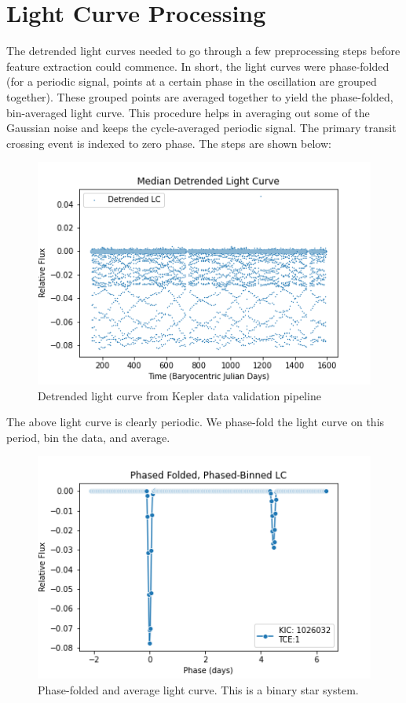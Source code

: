 \documentclass{article}
\begin{document}
\section{Light Curve Processing}
The detrended light curves needed to go through a few preprocessing steps before feature extraction could commence. In short, the light curves were phase-folded (for a periodic signal, points at a certain phase in the oscillation are grouped together). These grouped points are averaged together to yield the phase-folded, bin-averaged light curve. This procedure helps in averaging out some of the Gaussian noise and keeps the cycle-averaged periodic signal. The primary transit crossing event is indexed to zero phase. The steps are shown below:

 \begin{figure}[H]
	\begin{center}
		\includegraphics[totalheight=5cm]{figures/lc_detrend_secondaryFP_ex1.png}
	\end{center}
	\caption{Detrended light curve from Kepler data validation pipeline}
\end{figure}
The above light curve is clearly periodic. We phase-fold the light curve on this period, bin the data, and average.
 \begin{figure}[H]
	\begin{center}
		\includegraphics[totalheight=5cm]{figures/phasefolded_secondaryFP_ex1.png}
	\end{center}
	\caption{Phase-folded and average light curve. This is a binary star system.}
\end{figure}
\end{document}
